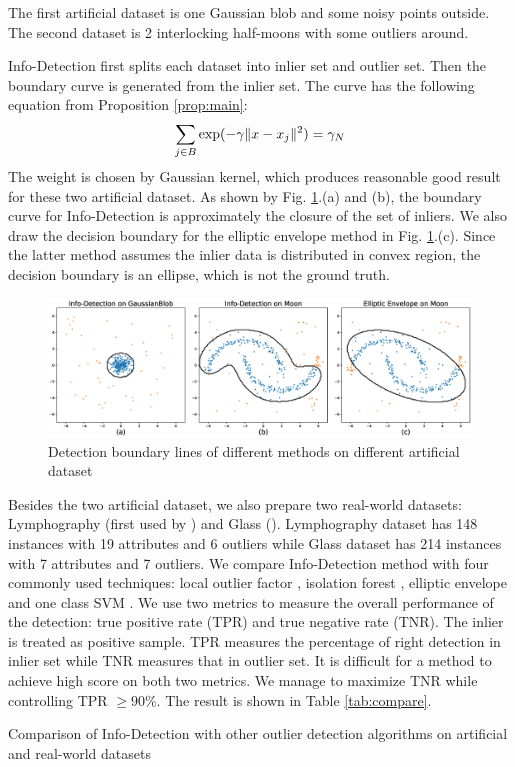 \documentclass[runningheads]{llncs}
\begin{document}
The first artificial dataset is one Gaussian blob and some noisy points outside.
The second dataset is 2 interlocking half-moons with some outliers around.

Info-Detection first splits each dataset into inlier set and outlier set. Then the boundary curve is generated from the inlier set. The curve has the following equation from Proposition \ref{prop:main}:
\begin{equation}
\sum_{j \in B} \exp(-\gamma \lVert x - x_j\rVert^2)= \gamma_N
\end{equation}
The weight is chosen by Gaussian kernel, which produces reasonable good result for these two artificial dataset. As shown by Fig. \ref{fig:boundary}.(a) and (b), the boundary curve for Info-Detection is approximately the closure of the set of inliers. We also draw the decision boundary for the elliptic envelope method in Fig. \ref{fig:boundary}.(c). Since the latter method assumes the inlier data is distributed in convex region, the decision boundary is an ellipse, which is not the ground truth.
\begin{figure}[!ht]
	\centering
	\includegraphics[width=\textwidth]{pic/outlier_boundary_illustration.eps}
	\caption{Detection boundary lines of different methods on different artificial dataset}	\label{fig:boundary}
\end{figure}

Besides the two artificial dataset, we also prepare two real-world datasets: Lymphography (first used by \cite{Lazarevic}) and Glass (\cite{hics}). Lymphography dataset has 148 instances with 19 attributes and 6 outliers while Glass dataset has 214 instances with 7 attributes and 7 outliers. We compare Info-Detection method with four commonly used techniques: local outlier factor \cite{Breunig}, isolation forest \cite{if}, elliptic envelope \cite{rousseeuw1999fast} and one class SVM \cite{svm}. We use two metrics to measure the overall performance of the detection: true positive rate (TPR) and true negative rate (TNR). The inlier is treated as positive sample. TPR measures the percentage of right detection in inlier set while TNR measures that in outlier set. It is difficult for a method to achieve high score on both two metrics. We manage to maximize TNR while controlling TPR $\geq 90\%$. The result is shown in Table \ref{tab:compare}.
\begin{table}[!ht]
\centering
{}
\caption{Comparison of Info-Detection with other outlier detection algorithms on artificial and real-world datasets}\label{tab:compare}
\end{table}
\end{document}
